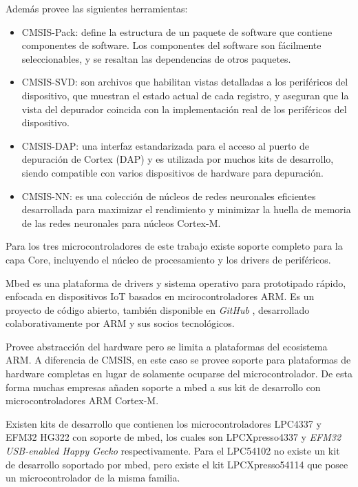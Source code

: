 Además provee las siguientes herramientas:

\begin{itemize}
\item
CMSIS-Pack: define la estructura de un paquete de software que contiene componentes de software. Los componentes del software son fácilmente seleccionables, y se resaltan las dependencias de otros paquetes.
\item
CMSIS-SVD: son archivos que habilitan vistas detalladas a los periféricos del dispositivo, que muestran el estado actual de cada registro, y aseguran que la vista del depurador coincida con la implementación real de los periféricos del dispositivo.
\item
CMSIS-DAP: una interfaz estandarizada para el acceso al puerto de depuración de Cortex (DAP) y es utilizada por muchos kits de desarrollo, siendo compatible con varios dispositivos de hardware para depuración.
\item
CMSIS-NN: es una colección de núcleos de redes neuronales eficientes desarrollada para maximizar el rendimiento y minimizar la huella de memoria de las redes neuronales para núcleos Cortex-M.
\end{itemize}

Para los tres microcontroladores de este trabajo existe soporte completo para la capa Core, incluyendo el núcleo de procesamiento y los drivers de periféricos.


Mbed es una plataforma de drivers y sistema operativo para prototipado rápido, enfocada en dispositivos IoT basados en mcirocontroladores ARM. Es un proyecto de código abierto, también disponible en \emph{GitHub} \citep{MbedGit}, desarrollado colaborativamente por ARM y sus socios tecnológicos.

Provee abstracción del hardware pero se limita a plataformas del ecosistema ARM. A diferencia de CMSIS, en este caso se provee soporte para plataformas de hardware completas en lugar de solamente ocuparse del microcontrolador. De esta forma muchas empresas añaden soporte a mbed a sus kit de desarrollo con microcontroladores ARM Cortex-M. 

Existen kits de desarrollo que contienen los microcontroladores LPC4337 y EFM32 HG322 con soporte de mbed, los cuales son LPCXpresso4337 \citep{LPCXpresso4337board} y \emph{EFM32 USB-enabled Happy Gecko} \citep{EFM32HGboard} respectivamente. Para el LPC54102 no existe un kit de desarrollo soportado por mbed, pero existe el kit LPCXpresso54114 \citep{LPCXpresso54114board} que posee un  microcontrolador de la misma familia.


